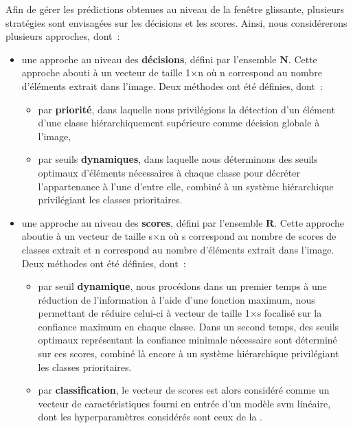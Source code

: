 Afin de gérer les prédictions obtenues au niveau de la fenêtre glissante, plusieurs stratégies sont envisagées sur les décisions et les scores. Ainsi, nous considérerons plusieurs approches, dont~:
\begin{itemize}
    \item   une approche au niveau des \textbf{décisions}, défini par l'ensemble $\mathbf{N}$. Cette approche abouti à un vecteur de taille 1$\times$n où n correspond au nombre d'éléments extrait dans l'image. Deux méthodes ont été définies, dont~: 
            \begin{itemize}
                \item par \textbf{priorité}, dans laquelle nous privilégions la détection d'un élément d'une classe hiérarchiquement supérieure comme décision globale à l'image,
                \item par seuils \textbf{dynamiques}, dans laquelle nous déterminons des seuils optimaux d'éléments nécessaires à chaque classe pour décréter l'appartenance à l'une d'entre elle, combiné à un système hiérarchique privilégiant les classes prioritaires.
            \end{itemize}
    \item   une approche au niveau des \textbf{scores}, défini par l'ensemble $\mathbf{R}$. Cette approche aboutie à un vecteur de taille s$\times$n où s correspond au nombre de scores de classes extrait et n correspond au nombre d'éléments extrait dans l'image. Deux méthodes ont été définies, dont~: 
            \begin{itemize}
                \item par seuil \textbf{dynamique}, nous procédons dans un premier temps à une réduction de l'information à l'aide d'une fonction maximum, nous permettant de réduire celui-ci à vecteur de taille 1$\times$s focalisé sur la confiance maximum en chaque classe. Dans un second temps, des seuils optimaux représentant la confiance minimale nécessaire sont déterminé sur ces scores, combiné là encore à un système hiérarchique privilégiant les classes prioritaires.
                \item par \textbf{classification}, le vecteur de scores est alors considéré comme un vecteur de caractéristiques fourni en entrée d'un modèle \gls{svm} linéaire, dont les hyperparamètres considérés sont ceux de la .
            \end{itemize}
\end{itemize}\par

